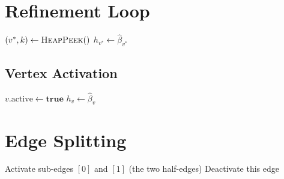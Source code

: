 \documentclass{article}
\begin{document}
\section{Refinement Loop}

\begin{algorithm}[H]
\caption{Greedy Mesh Refinement}
\begin{algorithmic}[1]
    \State $(v^*, k) \gets \textsc{HeapPeek}()$
        \State $h_{v^*} \gets \hat{\beta}_{v^*}$ 
            \State {}
        \EndFor
        \State {}
    \Else
        \State {} 
    \EndIf
\EndWhile
\end{algorithmic}
\end{algorithm}

\subsection{Vertex Activation}

\begin{algorithm}[H]
\caption{Activate($v$)}
\begin{algorithmic}[1]
    \State $v.\text{active} \gets \textbf{true}$
    \State $h_v \gets \hat{\beta}_v$
    \State {} 
        \State {}
    \EndFor
    \State {}
\end{algorithmic}
\end{algorithm}

\section{Edge Splitting}

\begin{algorithm}[H]
\caption{Edge.Split()}
\begin{algorithmic}[1]
            \State {}
        \EndWhile
    \EndFor
    \State Activate sub-edges $[0]$ and $[1]$ (the two half-edges)
    \State Deactivate this edge
\end{algorithmic}
\end{algorithm}
\end{document}
